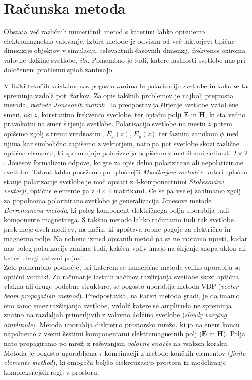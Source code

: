 \documentclass[longbibliography,slovene,a4paper,12pt]{book}
\begin{document}
\chapter{Računska metoda}

Obstaja več različnih numeričnih metod s katerimi lahko opisujemo elektromagnetno valovanje. Izbira metode je odvisna od več faktorjev: tipične dimenzije objektov v simulaciji, relevantnih časovnih dimenzij, frekvence oziroma valovne dolžine svetlobe, \emph{itn}. Pomembno je tudi, katere lastnosti svetlobe nas pri določenem problemu sploh zanimajo.

V fiziki tekočih kristalov nas pogosto zanima le polarizacija svetlobe in kako se ta spreminja vzdolž poti žarkov. Za opis takšnih problemov je najbolj preprosta metoda, \emph{metoda Jonesovih matrik}. Ta predpostavlja širjenje svetlobe vzdol ene smeri, osi $z$, konstantno frekvenco svetlobe, ter optični polji $\mathbf{E}$ in $\mathbf{H}$, ki sta vedno pravokotni na smer širjenja svetlobe. Polarizacijo svetlobe na mestu $z$ potem opišemo zgolj s tremi vrednostmi, $E_x(z)$, $E_y(z)$ ter faznim zamikom $\phi$ med njima kar simbolično zapišemo z vektorjem, nato pa pot svetlobe skozi različne optične elemente, ki spreminjajo polarizacijo oopišemo z matrikami velikosti $2\times2$\cite{jones}.  Jonesov formalizem odpove, ko gre za opis delno polarizirane ali nepolarizirane svetlobe. Takrat lahko posežemo po splošnejši \emph{Muellerjevi metodi} v kateri splošno stanje polarizacije svetlobe je moč opisati z 4-komponentnimi \emph{Stokesovimi vektorji}, optične elemente pa z $4 \times 4$ matrikami\cite{stallinga}. 
Če se pa vselej zanimamo zgolj za popolnoma polarizirano svetlobo je generalizacija Jonesove metode \emph{Berremanova metoda}, ki poleg komponent električnega polja uporablja tudi komponente magnetnega. S takšno metodo lahko računamo tudi tok svetlobe prek meje dveh medijev, na način, ki upošteva robne pogoje za električno in magnetno polje. Na nobeno izmed opisanih metod pa se ne moramo upreti, kadar nas poleg polarizacije zanima tudi, kakšen vpliv imajo na širjenje snopa uklon ali kateri drugi valovni pojavi.\\

Zelo pomembno področje, pri katerem se numerične metode veliko uporablja so optični vodniki. Za računanje lastnih načinov razširjanja svetlobe skozi optična vlakna ali druge podobne strukture, se pogosto uporablja metoda VBP (\emph{vector beam propagation method}). Predpostavka, na kateri metoda gradi, je da imamo eno samo smer razširjanja svetlobe, vzdolž katere se amplituda ne spreminja znatno na razdaljah primerljivih z valovno dolžino svetlobe (\emph{slowly varying amplitude}). Metoda uporablja diskretno prostorsko mrežo, ki jo na enem koncu napolnemo z vsemi šestimi komponentami elektromagnetnih polj ($\mathbf{E}$ in $\mathbf{H}$). Polja nato propagiramo po mreži z reševanjem \emph{valovne enačbe} na vsakem koraku. Metoda je pogosto uporabljena v kombinaciji z metodo končnih elementov (\emph{finite-elements method}), ki omogoča boljšo diskretizacijo prostora in modeliranje kompleksnejših regij v prostoru\cite{pedrola}.\\
\end{document}

